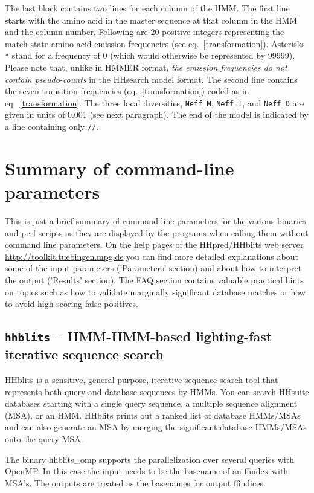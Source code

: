 \documentclass[11pt,a4paper]{article}
\begin{document}
 The last block contains two lines for each column of the HMM. The first line starts with the amino acid in the master sequence at that column in the HMM and the column number. Following are 20  positive integers representing the match state amino acid emission frequencies (see eq.\ \ref{transformation}). Asterisks \verb`*` stand for a frequency of 0 (which would otherwise be represented by 99999). Please note that, unlike in HMMER format,  \emph{the emission frequencies do not contain pseudo-counts} in the HHsearch model format. The second line contains the seven transition frequencies (eq.\ \ref{transformation}) coded as in eq.\ \ref{transformation}. The three local diversities, \verb`Neff_M`, \verb`Neff_I`, and \verb`Neff_D` are given in units of 0.001 (see next paragraph). The end of the model is indicated by a line containing only \verb`//`.


\section{Summary of command-line parameters}

This is just a brief summary of command line parameters for the various binaries and
perl scripts as they are displayed by the programs when calling them without 
command line parameters. On the help pages of the HHpred/HHblits web server
\url{http://toolkit.tuebingen.mpg.de} you can find more detailed explanations
about some of the input parameters  ('Parameters' section) and about how to interpret
the output ('Results' section). The FAQ section contains valuable practical hints on topics
such as how to validate marginally significant database matches or how to avoid high-scoring
false positives.


\subsection{{\tt hhblits} -- HMM-HMM-based lighting-fast iterative sequence search}

HHblits is a sensitive, general-purpose, iterative sequence search tool that represents
both query and database sequences by HMMs. You can search HHsuite databases starting
with a single query sequence, a multiple sequence alignment (MSA), or an HMM. HHblits
prints out a ranked list of database HMMs/MSAs and can also generate an MSA by merging
the significant database HMMs/MSAs onto the query MSA.

The binary hhblits\_omp supports the parallelization over several queries with OpenMP.
In this case the input needs to be the basename of an ffindex with MSA's.
The outputs are treated as the basenames for output ffindices.
\end{document}
